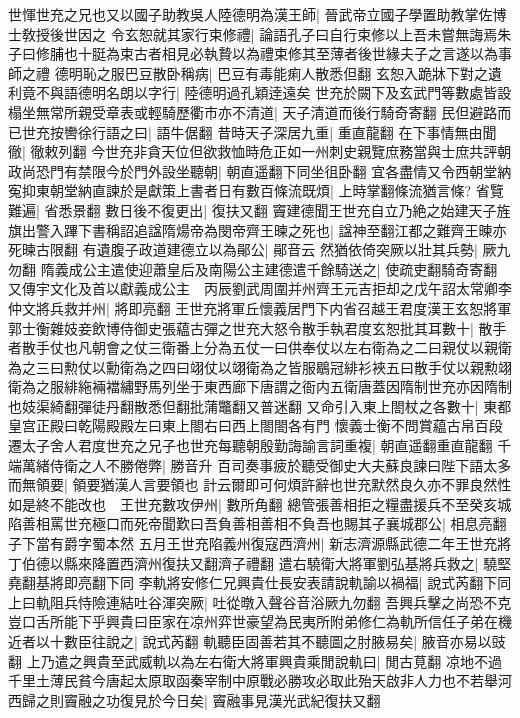 世惲世充之兄也又以國子助教吳人陸德明為漢王師|{
	晉武帝立國子學置助教掌佐博士敎授後世因之}
令玄恕就其家行束修禮|{
	論語孔子曰自行束修以上吾未嘗無誨焉朱子曰修脯也十脡為束古者相見必執贄以為禮束修其至薄者後世緣夫子之言遂以為事師之禮}
德明恥之服巴豆散卧稱病|{
	巴豆有毒能痢人散悉但翻}
玄恕入跪牀下對之遺利竟不與語德明名朗以字行|{
	陸德明過孔穎逹遠矣}
世充於闕下及玄武門等數處皆設榻坐無常所親受章表或輕騎歷衢市亦不清道|{
	天子清道而後行騎奇寄翻}
民但避路而已世充按轡徐行語之曰|{
	語牛倨翻}
昔時天子深居九重|{
	重直龍翻}
在下事情無由聞徹|{
	徹敕列翻}
今世充非貪天位但欲救恤時危正如一州刺史親覽庶務當與士庶共評朝政尚恐門有禁限今於門外設坐聽朝|{
	朝直遥翻下同坐徂卧翻}
宜各盡情又令西朝堂納寃抑東朝堂納直諫於是獻策上書者日有數百條流既煩|{
	上時掌翻條流猶言條?}
省覽難遍|{
	省悉景翻}
數日後不復更出|{
	復扶又翻}
竇建德聞王世充自立乃絶之始建天子旌旗出警入蹕下書稱詔追諡隋煬帝為閔帝齊王暕之死也|{
	諡神至翻江都之難齊王暕亦死暕古限翻}
有遺腹子政道建德立以為鄖公|{
	鄖音云}
然猶依倚突厥以壯其兵勢|{
	厥九勿翻}
隋義成公主遣使迎蕭皇后及南陽公主建德遣千餘騎送之|{
	使疏吏翻騎奇寄翻}
又傳宇文化及首以獻義成公主　丙辰劉武周圍并州齊王元吉拒却之戊午詔太常卿李仲文將兵救并州|{
	將即亮翻}
王世充將軍丘懷義居門下内省召越王君度漢王玄恕將軍郭士衡雜妓妾飲博侍御史張藴古彈之世充大怒令散手執君度玄恕批其耳數十|{
	散手者散手仗也凡朝會之仗三衛番上分為五仗一曰供奉仗以左右衛為之二曰親仗以親衛為之三曰勲仗以勳衛為之四曰翊仗以翊衛為之皆服鶡冠緋衫裌五曰散手仗以親勲翊衛為之服緋絁裲襠繡野馬列坐于東西廊下唐謂之衙内五衛唐蓋因隋制世充亦因隋制也妓渠綺翻彈徒丹翻散悉但翻批蒲鼈翻又普迷翻}
又命引入東上閤杖之各數十|{
	東都皇宫正殿曰乾陽殿殿左曰東上閤右曰西上閤閤各有門}
懷義士衡不問賞藴古帛百段遷太子舍人君度世充之兄子也世充每聽朝殷勤誨諭言詞重複|{
	朝直遥翻重直龍翻}
千端萬緒侍衛之人不勝倦弊|{
	勝音升}
百司奏事疲於聽受御史大夫蘇良諫曰陛下語太多而無領要|{
	領要猶漢人言要領也}
計云爾即可何煩許辭也世充默然良久亦不罪良然性如是終不能改也　王世充數攻伊州|{
	數所角翻}
總管張善相拒之糧盡援兵不至癸亥城陷善相罵世充極口而死帝聞歎曰吾負善相善相不負吾也賜其子襄城郡公|{
	相息亮翻子下當有爵字蜀本然}
五月王世充陷義州復寇西濟州|{
	新志濟源縣武德二年王世充將丁伯德以縣來降置西濟州復扶又翻濟子禮翻}
遣右驍衛大將軍劉弘基將兵救之|{
	驍堅堯翻基將即亮翻下同}
李軌將安修仁兄興貴仕長安表請說軌諭以禍福|{
	說式芮翻下同}
上曰軌阻兵恃險連結吐谷渾突厥|{
	吐從暾入聲谷音浴厥九勿翻}
吾興兵擊之尚恐不克豈口舌所能下乎興貴曰臣家在凉州弈世豪望為民夷所附弟修仁為軌所信任子弟在機近者以十數臣往說之|{
	說式芮翻}
軌聽臣固善若其不聽圖之肘腋易矣|{
	腋音亦易以豉翻}
上乃遣之興貴至武威軌以為左右衛大將軍興貴乘閒說軌曰|{
	閒古莧翻}
凉地不過千里土薄民貧今唐起太原取函秦宰制中原戰必勝攻必取此殆天啟非人力也不若舉河西歸之則竇融之功復見於今日矣|{
	竇融事見漢光武紀復扶又翻}
